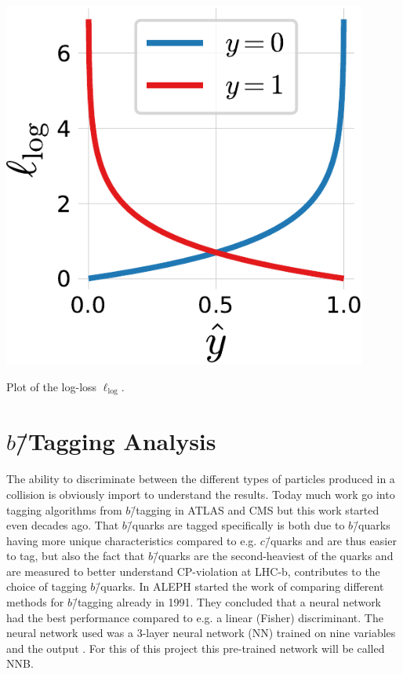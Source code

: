 \begin{marginfigure}
  \includegraphics[draft=false, width=0.9\textwidth]{figures/log_loss_cross_entropy/logloss.pdf}
  \caption[Plot of the log-loss $\ell_\mathrm{log}$]
          {Plot of the log-loss $\ell_\mathrm{log}$.} 
  \label{fig:q:logloss}
\end{marginfigure}

\FloatBarrier
\section[b-Tagging Analysis]{$b$\=/Tagging Analysis}
\label{sec:q:b_tagging_analysis}

The ability to discriminate between the different types of particles produced in a collision is obviously import to understand the results. Today much work go into tagging algorithms from $b$\=/tagging in ATLAS and CMS \autocite{scodellaroTaggingATLASCMS2017} but this work started even decades ago. That $b$\=/quarks are tagged specifically is both due to $b$\=/quarks having more unique characteristics compared to e.g. $c$\=/quarks and are thus easier to tag, but also the fact that $b$\=/quarks are the second-heaviest of the quarks and are measured to better understand CP-violation at LHC-b, contributes to the choice of tagging $b$\=/quarks. In ALEPH \citet{proriolTAGGINGQUARKEVENTS1991} started the work of comparing different methods for $b$\=/tagging already in \num{1991}. They concluded that a neural network had the best performance compared to e.g. a linear (Fisher) discriminant. The neural network used was a 3-layer neural network (NN) trained on nine variables and the output . For this of this project this pre-trained network will be called NNB. 

